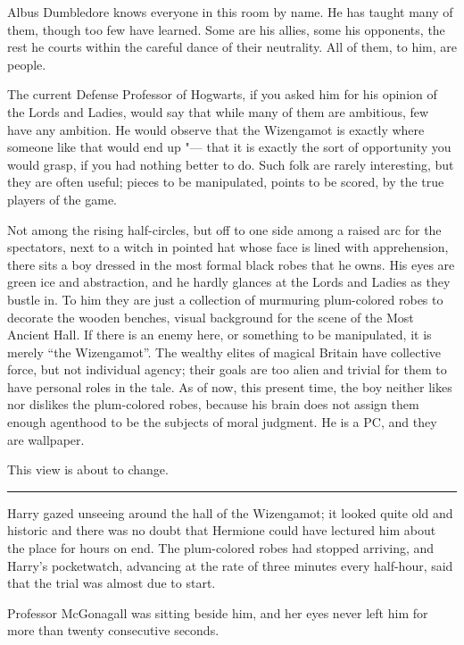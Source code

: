 Albus Dumbledore knows everyone in this room by name. He has taught many
of them, though too few have learned. Some are his allies, some his
opponents, the rest he courts within the careful dance of their
neutrality. All of them, to him, are people.

The current Defense Professor of Hogwarts, if you asked him for his
opinion of the Lords and Ladies, would say that while many of them are
ambitious, few have any ambition. He would observe that the Wizengamot
is exactly where someone like that would end up "--- that it is exactly the
sort of opportunity you would grasp, if you had nothing better to do.
Such folk are rarely interesting, but they are often useful; pieces to
be manipulated, points to be scored, by the true players of the game.

Not among the rising half-circles, but off to one side among a raised
arc for the spectators, next to a witch in pointed hat whose face is
lined with apprehension, there sits a boy dressed in the most formal
black robes that he owns. His eyes are green ice and abstraction, and he
hardly glances at the Lords and Ladies as they bustle in. To him they
are just a collection of murmuring plum-colored robes to decorate the
wooden benches, visual background for the scene of the Most Ancient
Hall. If there is an enemy here, or something to be manipulated, it is
merely ``the Wizengamot''. The wealthy elites of magical Britain have
collective force, but not individual agency; their goals are too alien
and trivial for them to have personal roles in the tale. As of now, this
present time, the boy neither likes nor dislikes the plum-colored robes,
because his brain does not assign them enough agenthood to be the
subjects of moral judgment. He is a PC, and they are wallpaper.

This view is about to change.

\begin{center}\rule{3in}{0.4pt}\end{center}

Harry gazed unseeing around the hall of the Wizengamot; it looked quite
old and historic and there was no doubt that Hermione could have
lectured him about the place for hours on end. The plum-colored robes
had stopped arriving, and Harry's pocketwatch, advancing at the rate of
three minutes every half-hour, said that the trial was almost due to
start.

Professor McGonagall was sitting beside him, and her eyes never left him
for more than twenty consecutive seconds.

